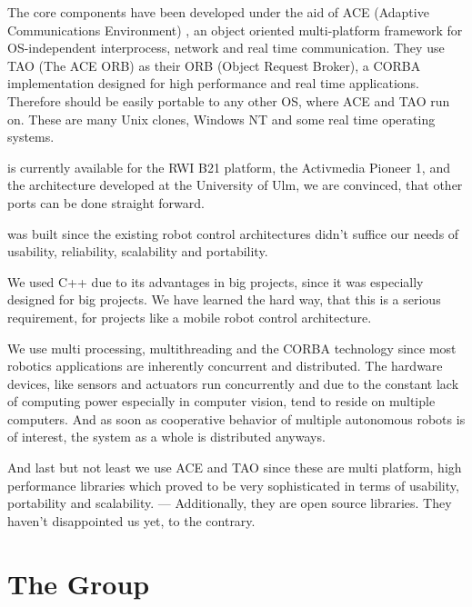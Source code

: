\documentclass[10pt]{book}
\begin{document}
The \miro core components have been developed under the aid of ACE
(Adaptive Communications Environment) \cite{ACE-Paper, ACE-Manual}, an
object oriented multi-platform framework for OS-independent
interprocess, network and real time communication. They use TAO (The
ACE ORB) \cite{TAO-paper} as their ORB (Object Request Broker), a
CORBA implementation designed for high performance and real time
applications. Therefore \miro should be easily portable to any other
OS, where ACE and TAO run on.  These are many Unix clones, Windows NT
and some real time operating systems.

\miro is currently available for the RWI B21 platform, the Activmedia
Pioneer 1, and the \sparrow architecture developed at the University
of Ulm, we are convinced, that other ports can be done straight
forward.

\miro was built since the existing robot control architectures didn't
suffice our needs of usability, reliability, scalability and
portability.

We used C++ due to its advantages in big projects, since it was
especially designed for big projects. We have learned the hard way,
that this is a serious requirement, for projects like a mobile robot
control architecture.

We use multi processing, multithreading and the CORBA technology since
most robotics applications are inherently concurrent and distributed.
The hardware devices, like sensors and actuators run concurrently and
due to the constant lack of computing power especially in computer
vision, tend to reside on multiple computers. And as soon as
cooperative behavior of multiple autonomous robots is of interest, the
system as a whole is distributed anyways.


And last but not least we use ACE and TAO since these are multi
platform, high performance libraries which proved to be very
sophisticated in terms of usability, portability and scalability. ---
Additionally, they are open source libraries. They haven't
disappointed us yet, to the contrary.

\section{The \miro Group}
\end{document}
